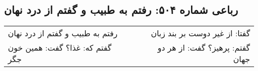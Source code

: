 \begin{center}
\section*{رباعی شماره ۵۰۴: رفتم به طبیب و گفتم از درد نهان}
\label{sec:sh504}
\begin{longtable}{l p{0.5cm} r}
رفتم به طبیب و گفتم از درد نهان
&&
گفتا: از غیر دوست بر بند زبان
\\
گفتم که: غذا؟ گفت: همین خون جگر
&&
گفتم: پرهیز؟ گفت: از هر دو جهان
\\
\end{longtable}
\end{center}
